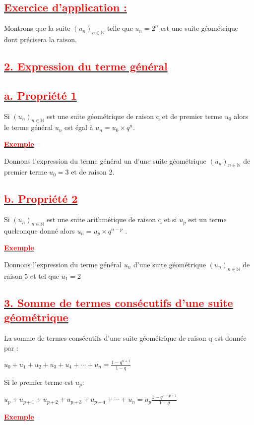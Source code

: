 \documentclass[12pt]{article}
\begin{document}
\subsection*{\underline{\textbf{\textcolor{red}{Exercice d’application : }}}}
Montrons que la suite $(u_{n})_{n\in\mathbb{N}}$ telle que $u_{n} = 2^{n}$ est une suite géométrique dont précisera la raison.
\subsection*{\underline{\textbf{\textcolor{red}{2. Expression du terme général}}}}
\subsection*{\underline{\textbf{\textcolor{red}{a. Propriété 1}}}}
Si $(u_{n})_{n\in\mathbb{N}}$ est une suite géométrique de raison q et de premier terme $u_{0}$ alors le terme général $u_{n}$ est égal à $u_{n} = u_{0} × q^{n}$.

\underline{\textbf{\textcolor{red}{Exemple}}}

Donnons l’expression du terme général un d’une suite géométrique $(u_{n})_{n\in\mathbb{N}}$ de premier terme 
$u_{0} = 3$ et de raison 2.
\subsection*{\underline{\textbf{\textcolor{red}{b. Propriété 2}}}}
Si $(u_{n})_{n\in\mathbb{N}}$ est une suite arithmétique de raison q et si $u_{p}$ est un terme quelconque donné alors $u_{n} = u_{p} × q^{n-p}$ .

\underline{\textbf{\textcolor{red}{Exemple}}}

Donnons l’expression du terme général $u_{n}$ d’une suite géométrique $(u_{n})_{n\in\mathbb{N}}$ de raison 5 et tel que $u_{1} = 2$
\subsection*{\underline{\textbf{\textcolor{red}{3. Somme de termes consécutifs d’une suite géométrique}}}}
La somme de termes consécutifs d’une suite géométrique de raison q est donnée par :

$u_{0}+u_{1}+u_{2}+u_{3}+u_{4}+\cdots+u_{n}=\frac{1-q^{n+1}}{1-q}$

Si le premier terme  est $u_{p}$:

$u_{p}+u_{p+1}+u_{p+2}+u_{p+3}+u_{p+4}+\cdots+u_{n}=u_{p}\frac{1-q^{n-p+1}}{1-q}$

\underline{\textbf{\textcolor{red}{Exemple}}}
\end{document}
